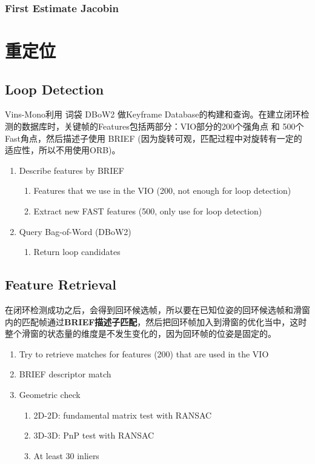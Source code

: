 \documentclass[12pt,a4paper]{article}
\begin{document}
\subsubsection{First Estimate Jacobin}

\section{重定位}

\subsection{Loop Detection}

Vins-Mono利用 词袋 DBoW2 做Keyframe Database的构建和查询。在建立闭环检测的数据库时，关键帧的Features包括两部分：VIO部分的200个强角点 和 500个Fast角点，然后描述子使用 BRIEF (因为旋转可观，匹配过程中对旋转有一定的适应性，所以不用使用ORB)。

\begin{enumerate}
\item Describe features by BRIEF
  \begin{enumerate}
  \item Features that we use in the VIO (200, not enough for loop detection)
  \item Extract new FAST features (500, only use for loop detection)
  \end{enumerate}
\item Query Bag-of-Word (DBoW2)
  \begin{enumerate}
  \item Return loop candidates
  \end{enumerate}
\end{enumerate}

\subsection{Feature Retrieval}

在闭环检测成功之后，会得到回环候选帧，所以要在已知位姿的回环候选帧和滑窗内的匹配帧通过\textbf{BRIEF描述子匹配}，然后把回环帧加入到滑窗的优化当中，这时整个滑窗的状态量的维度是不发生变化的，因为回环帧的位姿是固定的。

\begin{enumerate}
\item Try to retrieve matches for features (200) that are used in the VIO
\item BRIEF descriptor match
\item Geometric check
  \begin{enumerate}
  \item 2D-2D: fundamental matrix test with RANSAC
  \item 3D-3D: PnP test with RANSAC
  \item At least 30 inliers
  \end{enumerate}
\end{enumerate}
\end{document}
